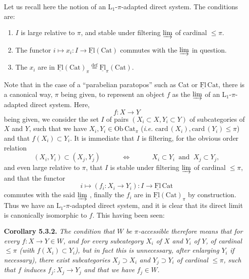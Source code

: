 \documentclass[11pt]{article}
\newcommand{\msp}[1]{\marginpar{\footnotesize [#1]}}
\newcommand{\uFl}{\underline{\mathrm{Fl}}}
\begin{document}
Let us recall here the notion of an L$_1$-$\pi$-adapted direct system. The conditions are:
\begin{enumerate}[label={}]
\item[1°)] $I$ is large relative to $\pi$, and stable under filtering $\varinjlim$ of cardinal $\leq \pi$.
\item[2°)] The functor $i \longmapsto x_i : I \longrightarrow \uFl(\mathrm{Cat})$ commutes with the $\varinjlim$ in question.
\item[3°)] The $x_i$ are in $\uFl(\mathrm{Cat})_\pi \overset{\text{def}}{=} \uFl_\pi(\mathrm{Cat})$.
\end{enumerate}
Note that in the case of a ``parabelian paratopos'' such as Cat or $\uFl\,\mathrm{Cat}$, there is a canonical way, $\pi$ being given, to represent an object $f$ as the $\varinjlim$ of an L$_1$-$\pi$-adapted direct system. Here,
\[
f : X \longrightarrow Y
\]
being given, we consider the set $I$ of
\msp{page 78}
pairs $(X_i \subset X, Y_i \subset Y)$ of subcategories of $X$ and $Y$, such that we have $X_i, Y_i \in \mathrm{Ob}\,\mathrm{Cat}_\pi$ (\textit{i.e.} $\mathrm{card}\,(X_i), \mathrm{card}\,(Y_i) \leq \pi$) and that $f(X_i) \subset Y_i$. It is immediate that $I$ is filtering, for the obvious order relation
\[
(X_i, Y_i) \subset (X_j, Y_j) \qquad\quad \Longleftrightarrow \qquad\quad X_i \subset Y_i \ \text{ and } \ X_j \subset Y_j, %
\]
and even large relative to $\pi$, that $I$ is stable under filtering $\varinjlim$ of cardinal $\leq \pi$, and that the functor
\[
i \longmapsto (f_i : X_i \longrightarrow Y_i) : I \longrightarrow \uFl\,\mathrm{Cat}
\]
commutes with the said $\varinjlim$ , finally the $f_i$ are in $\uFl(\mathrm{Cat})_\pi$ by construction. Thus we have an L$_1$-$\pi$-adapted direct system, and it is clear that its direct limit is canonically isomorphic to $f$. This having been seen:

\textbf{Corollary 5.3.2.} \textit{The condition that $W$ be $\pi$-accessible therefore means that for every $f : X \longrightarrow Y \in W$, and for every subcategory $X_i$ of $X$ and $Y_i$ of $Y$, of cardinal $\leq \pi$ (with $f(X_i) \subset Y_i$), but in fact this is unnecessary, after enlarging $Y_i$ if necessary), there exist subcategories} %
\msp{page 79}
\textit{$X_j \supset X_i$ and $Y_j \supset Y_i$ of cardinal $\leq \pi$, such that $f$ induces $f_j : X_j \longrightarrow Y_j$ and that we have $f_j \in W$.}
\end{document}
